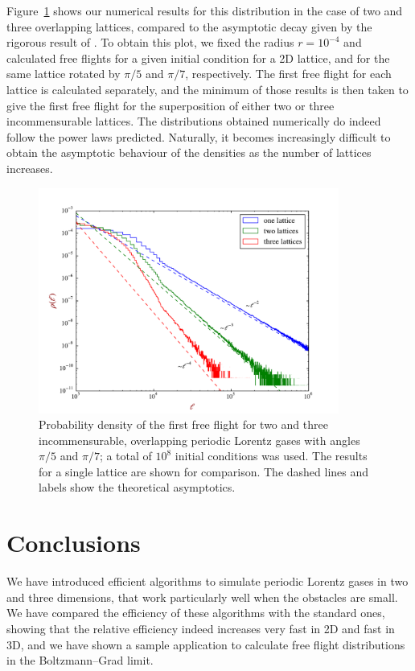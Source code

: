 \documentclass{iopart}
\begin{document}
Figure~\ref{fig:free-flights} shows our numerical results for this distribution in the case of two and three overlapping lattices, compared to the asymptotic decay given by the rigorous result of \cite{marklof2014power}. 
To obtain this plot, we fixed the radius $r=10^{-4}$ and calculated free flights for a given initial condition for a 2D lattice, and for the same lattice rotated by $\pi/5$ and $\pi/7$, respectively. The first free flight for each lattice is calculated separately, and the minimum of those results is then taken to give the first free flight for the superposition of either two or three incommensurable lattices. 
The distributions obtained numerically do indeed follow the power laws predicted.  Naturally, it becomes increasingly difficult to obtain the asymptotic behaviour of the densities as the number of lattices increases.

\begin{figure}
\centering
\includegraphics*[width=280pt]{free_flight_distribution_incommensurable}%
\caption{Probability density of the first free flight for two and three incommensurable, overlapping periodic Lorentz gases with angles $\pi/5$ and $\pi/7$; a total of $10^{8}$ initial conditions was used. The results for a single lattice are shown for comparison. The dashed lines and labels show the theoretical asymptotics.}
\label{fig:free-flights}
\end{figure}

\section{Conclusions}  

We have introduced efficient algorithms to simulate periodic Lorentz gases in two and three dimensions, that work particularly well when the obstacles are small. We have compared the efficiency of these algorithms with the standard ones, showing that the relative efficiency indeed increases very fast in 2D and fast in 3D, and we have shown a sample application to calculate free flight distributions in the Boltzmann--Grad limit.
\end{document}
